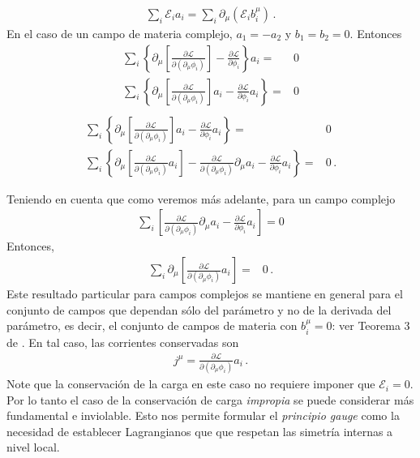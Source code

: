 \begin{align}
  \sum_i \mathcal{E}_ia_i=\sum_i  \partial_{\mu}   \left(  \mathcal{E}_i b^{\mu}_i  \right) \,.
\end{align}
En el caso de un campo de materia complejo, $a_1=-a_2$ y $b_1=b_2=0$. Entonces
\begin{align}
\sum_i \left\{ \partial_{\mu} \left[ \frac{\partial\mathcal{L}}{\partial(\partial_{\mu}\phi_i)}\right]-\frac{\partial\mathcal{L}}{\partial\phi_i} \right\}a_i=&0 \nonumber\\
\sum_i \left\{ \partial_{\mu} \left[ \frac{\partial\mathcal{L}}{\partial(\partial_{\mu}\phi_i)}\right]a_i-\frac{\partial\mathcal{L}}{\partial\phi_i}a_i \right\}=&0 \nonumber\\
\end{align}
\begin{align}
\sum_i \left\{ \partial_{\mu} \left[ \frac{\partial\mathcal{L}}{\partial(\partial_{\mu}\phi_i)}\right]a_i-\frac{\partial\mathcal{L}}{\partial\phi_i}a_i \right\}=&0 \nonumber\\
\sum_i \left\{ \partial_{\mu} \left[ \frac{\partial\mathcal{L}}{\partial(\partial_{\mu}\phi_i)}a_i\right]-\frac{\partial\mathcal{L}}{\partial(\partial_{\mu}\phi_i)}\partial_{\mu}a_i-\frac{\partial\mathcal{L}}{\partial\phi_i}a_i \right\}=&0 \,.
\end{align}


Teniendo en cuenta que como veremos más adelante, para un campo complejo
\begin{align}
\sum_i \left[\frac{\partial\mathcal{L}}{\partial(\partial_{\mu}\phi_i)}\partial_{\mu}a_i-\frac{\partial\mathcal{L}}{\partial\phi_i}a_i \right]=0
\end{align}
Entonces, 
\begin{align}
\sum_i \partial_{\mu} \left[ \frac{\partial\mathcal{L}}{\partial(\partial_{\mu}\phi_i)}a_i\right]=&0\,.
\end{align}
Este resultado particular para campos complejos se mantiene en general para el conjunto de campos que dependan sólo del parámetro y no de la derivada del parámetro, es decir, el conjunto de campos de materia con $b_i^\mu=0$: ver Teorema 3 de \cite{Brading:2000hc}. En tal caso, las corrientes conservadas son
\begin{align}
\label{eq:tnoeth2}
j^\mu=\frac{\partial\mathcal{L}}{\partial(\partial_{\mu}\phi_i)}a_{i}\,.
\end{align}
Note que la conservación de la carga en este caso no requiere imponer que $\mathcal{E}_i=0$. Por lo tanto el caso de la conservación de carga \emph{impropia} se puede considerar más fundamental e inviolable. Esto nos permite formular el \emph{principio gauge} como la necesidad de establecer Lagrangianos que que respetan las simetría internas a nivel local.

